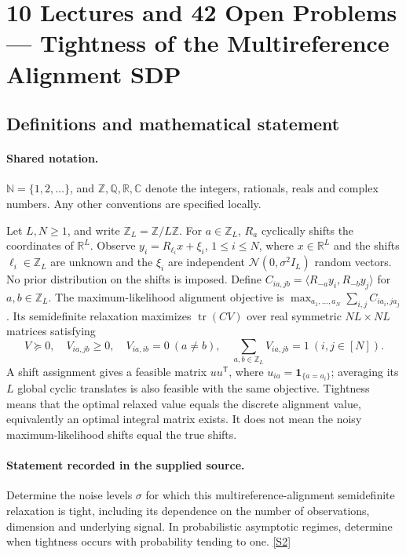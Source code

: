 \documentclass[11pt]{article}
\newcommand{\sref}[2]{\hyperlink{source:#1:#2}{[S#2]}}
\begin{document}
\section{10 Lectures and 42 Open Problems — Tightness of the Multireference Alignment SDP}\label{statement}

\subsection{Definitions and mathematical statement}

\paragraph{Shared notation.}$\mathbb N=\{1,2,\ldots\}$, and $\mathbb Z,\mathbb Q,\mathbb R,\mathbb C$ denote the integers, rationals, reals and complex numbers. Any other conventions are specified locally.


Let $L,N\ge1$, and write $\mathbb Z_L=\mathbb Z/L\mathbb Z$. For $a\in\mathbb Z_L$, $R_a$ cyclically shifts the coordinates of $\mathbb R^L$. Observe $y_i=R_{\ell_i}x+\xi_i$, $1\le i\le N$, where $x\in\mathbb R^L$ and the shifts $\ell_i\in\mathbb Z_L$ are unknown and the $\xi_i$ are independent $\mathcal N(0,\sigma^2 I_L)$ random vectors. No prior distribution on the shifts is imposed. Define $C_{ia,jb}=\langle R_{-a}y_i,R_{-b}y_j\rangle$ for $a,b\in\mathbb Z_L$. The maximum-likelihood alignment objective is $\max_{a_1,\ldots,a_N}\sum_{i,j}C_{ia_i,ja_j}$. Its semidefinite relaxation maximizes $\operatorname{tr}(CV)$ over real symmetric $NL\times NL$ matrices satisfying \[V\succeq0,\quad V_{ia,jb}\ge0,\quad V_{ia,ib}=0\ (a\ne b),\quad \sum_{a,b\in\mathbb Z_L}V_{ia,jb}=1\ (i,j\in[N]).\] A shift assignment gives a feasible matrix $u u^\mathsf T$, where $u_{ia}=\mathbf1_{\{a=a_i\}}$; averaging its $L$ global cyclic translates is also feasible with the same objective. Tightness means that the optimal relaxed value equals the discrete alignment value, equivalently an optimal integral matrix exists. It does not mean the noisy maximum-likelihood shifts equal the true shifts.
\paragraph{Statement recorded in the supplied source.}
Determine the noise levels $\sigma$ for which this multireference-alignment semidefinite relaxation is tight, including its dependence on the number of observations, dimension and underlying signal. In probabilistic asymptotic regimes, determine when tightness occurs with probability tending to one. \sref{statement}{2}
\end{document}
